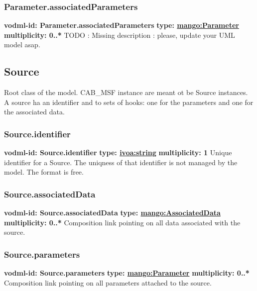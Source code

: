    \subsubsection{Parameter.associatedParameters}
      \textbf{vodml-id: Parameter.associatedParameters} \newline
      \textbf{type: \hyperref[sect:Parameter]{mango:Parameter}} \newline
      \textbf{multiplicity: 0..*} \newline 
      TODO : Missing description : please, update your UML model asap.
  

  \subsection{Source}
  \label{sect:Source}
    Root class of the model. CAB\_MSF instance are meant ot be Source instances. A source ha an identifier and to sets of hooks: one for the parameters and one for the associated data.

    \subsubsection{Source.identifier}
      \textbf{vodml-id: Source.identifier} \newline
      \textbf{type: \hyperref[sect:ivoa]{ivoa:string}} \newline
      \textbf{multiplicity: 1} \newline 
      Unique identifier for a Source. The uniqness of that identifier is not managed by the model. The format is free.

    \subsubsection{Source.associatedData}
      \textbf{vodml-id: Source.associatedData} \newline
      \textbf{type: \hyperref[sect:AssociatedData]{mango:AssociatedData}} \newline
      \textbf{multiplicity: 0..*} \newline 
      Composition link pointing on all data associated with the source.

    \subsubsection{Source.parameters}
      \textbf{vodml-id: Source.parameters} \newline
      \textbf{type: \hyperref[sect:Parameter]{mango:Parameter}} \newline
      \textbf{multiplicity: 0..*} \newline 
      Composition link pointing on all parameters attached to the source.


